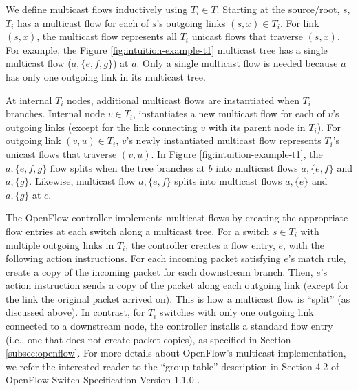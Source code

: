 We define multicast flows inductively using $T_i \in T$.  Starting at the source/root, $s$, $T_i$ has a multicast flow for each of $s$'s outgoing links $(s,x) \in T_i$. 
For link $(s,x)$, the multicast flow represents all $T_i$ unicast flows that traverse $(s,x)$. %
For example, the Figure \ref{fig:intuition-example-t1} multicast tree has a single multicast flow ($a,\{e,f,g\}$) at $a$.   Only a single multicast flow is needed
because $a$ has only one outgoing link in its multicast tree.   

At internal $T_i$ nodes, additional multicast flows are instantiated when $T_i$ branches.  %
Internal node $v \in T_i$, instantiates a new multicast flow for each of $v$'s outgoing links (except for the link connecting $v$ with its parent node in $T_i$).  For outgoing link $(v,u) \in T_i$, 
$v$'s newly instantiated multicast flow represents $T_i$'s unicast flows that traverse $(v,u)$.  In Figure \ref{fig:intuition-example-t1}, the $a,\{e,f,g\}$ flow 
splits when the tree branches at $b$ into multicast flows $a,\{e,f\}$ and $a,\{g\}$.  Likewise, multicast flow $a,\{e,f\}$ splits into multicast flows $a,\{e\}$ and $a,\{g\}$ at $c$.

The OpenFlow controller implements multicast flows by creating the appropriate flow entries at each switch along a multicast tree.  
For a switch $s \in T_i$ with multiple outgoing links in $T_i$, the controller creates a flow entry, $e$, with the following action instructions.
For each incoming packet satisfying $e$'s match rule, create a copy of the incoming packet for each downstream branch. 
Then, $e$'s action instruction sends a copy of the packet along each outgoing link (except for the link the original packet arrived on).  This is how a multicast flow is ``split'' (as discussed above).
In contrast, for $T_i$ switches with only one outgoing link connected to a downstream node, the controller installs a standard flow entry (i.e., one that does not create packet copies),
as specified in Section \ref{subsec:openflow}. For more details about OpenFlow's multicast implementation, we refer the interested reader to the ``group table'' description in Section 4.2 of OpenFlow Switch Specification 
Version 1.1.0 \cite{OpenFlowSpec1.1}.


